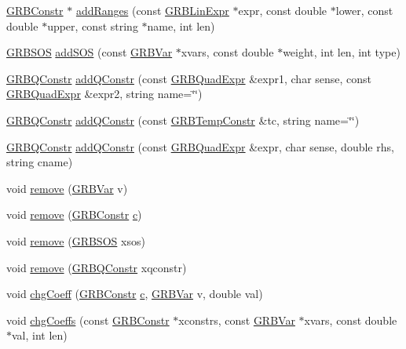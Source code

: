\begin{DoxyCompactItemize}
\item 
\hyperlink{classGRBConstr}{G\+R\+B\+Constr} $\ast$ \hyperlink{classGRBModel_a7d398eb440616e3ab7438ccb1dcd3624}{add\+Ranges} (const \hyperlink{classGRBLinExpr}{G\+R\+B\+Lin\+Expr} $\ast$expr, const double $\ast$lower, const double $\ast$upper, const string $\ast$name, int len)
\item 
\hyperlink{classGRBSOS}{G\+R\+B\+S\+OS} \hyperlink{classGRBModel_a8a127afa0ed029c7dff13c03ab66bc07}{add\+S\+OS} (const \hyperlink{classGRBVar}{G\+R\+B\+Var} $\ast$xvars, const double $\ast$weight, int len, int type)
\item 
\hyperlink{classGRBQConstr}{G\+R\+B\+Q\+Constr} \hyperlink{classGRBModel_a85a2af8c63488d161906f7e29c976306}{add\+Q\+Constr} (const \hyperlink{classGRBQuadExpr}{G\+R\+B\+Quad\+Expr} \&expr1, char sense, const \hyperlink{classGRBQuadExpr}{G\+R\+B\+Quad\+Expr} \&expr2, string name=\char`\"{}\char`\"{})
\item 
\hyperlink{classGRBQConstr}{G\+R\+B\+Q\+Constr} \hyperlink{classGRBModel_a8f1c1cd83d74ae931b1a2e8b941011a1}{add\+Q\+Constr} (const \hyperlink{classGRBTempConstr}{G\+R\+B\+Temp\+Constr} \&tc, string name=\char`\"{}\char`\"{})
\item 
\hyperlink{classGRBQConstr}{G\+R\+B\+Q\+Constr} \hyperlink{classGRBModel_abcb46d2d8b02d714e4359c1c57ffc15c}{add\+Q\+Constr} (const \hyperlink{classGRBQuadExpr}{G\+R\+B\+Quad\+Expr} \&expr, char sense, double rhs, string cname)
\item 
void \hyperlink{classGRBModel_a9465c542f5e612f028b669f18e074a8c}{remove} (\hyperlink{classGRBVar}{G\+R\+B\+Var} v)
\item 
void \hyperlink{classGRBModel_aa53fa2a1da135e40b106594fa9f50c27}{remove} (\hyperlink{classGRBConstr}{G\+R\+B\+Constr} \hyperlink{IntArray2bmp_8h_ae9d8014c37dbf37873bdee6b8497a065}{c})
\item 
void \hyperlink{classGRBModel_aee6ae45e2945292f0e900473e24b08f6}{remove} (\hyperlink{classGRBSOS}{G\+R\+B\+S\+OS} xsos)
\item 
void \hyperlink{classGRBModel_af4b9518f82d0ae65f0f5f0cbb0301cc2}{remove} (\hyperlink{classGRBQConstr}{G\+R\+B\+Q\+Constr} xqconstr)
\item 
void \hyperlink{classGRBModel_a91417ce8780706480b40e095b4bc0d87}{chg\+Coeff} (\hyperlink{classGRBConstr}{G\+R\+B\+Constr} \hyperlink{IntArray2bmp_8h_ae9d8014c37dbf37873bdee6b8497a065}{c}, \hyperlink{classGRBVar}{G\+R\+B\+Var} v, double val)
\item 
void \hyperlink{classGRBModel_a17d9363c54c8f81f3110bf7d4a8905be}{chg\+Coeffs} (const \hyperlink{classGRBConstr}{G\+R\+B\+Constr} $\ast$xconstrs, const \hyperlink{classGRBVar}{G\+R\+B\+Var} $\ast$xvars, const double $\ast$val, int len)

\end{DoxyCompactItemize}
